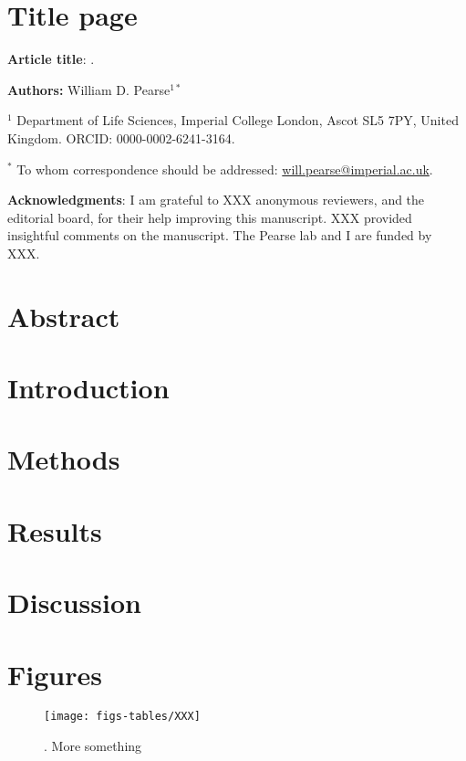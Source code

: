 \documentclass[12pt]{report}
\begin{document}
\section*{Title page}
\textbf{Article title}: . 

\textbf{Authors:} William D. Pearse$^{1*}$

$^1$ Department of Life Sciences, Imperial College London, Ascot SL5 7PY, United Kingdom. ORCID: 0000-0002-6241-3164.

$^*$ To whom correspondence should be addressed: \url{will.pearse@imperial.ac.uk}.

\textbf{Acknowledgments}: I am grateful to XXX anonymous reviewers, and the editorial board, for their help improving this manuscript. XXX provided insightful comments on the manuscript. The Pearse lab and I are funded by XXX.

\newpage
\section{Abstract}

\newpage
\section{Introduction}

\newpage
\section{Methods}

\newpage
\section{Results}

\newpage
\section{Discussion}

\newpage
\section{Figures}
\begin{figure}
  \center
  \texttt{[image: figs-tables/XXX]}
  \caption{\textbf{\Soemthing}. More something}
  \label{xxx}
\end{figure}

\clearpage
\renewcommand\bibname{References}
\printbibliography
\end{document}
